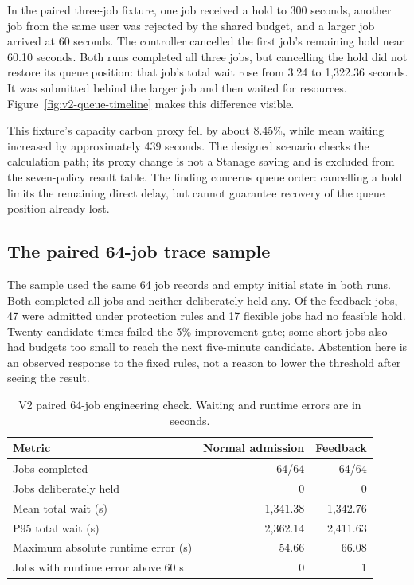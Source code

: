 In the paired three-job fixture, one job received a hold to 300 seconds, another job from the same user was rejected by the shared budget, and a larger job arrived at 60 seconds. The controller cancelled the first job's remaining hold near 60.10 seconds. Both runs completed all three jobs, but cancelling the hold did not restore its queue position: that job's total wait rose from 3.24 to 1,322.36 seconds. It was submitted behind the larger job and then waited for resources. Figure~\ref{fig:v2-queue-timeline} makes this difference visible.

\FloatBarrier

This fixture's capacity carbon proxy fell by about 8.45\%, while mean waiting increased by approximately 439 seconds. The designed scenario checks the calculation path; its proxy change is not a Stanage saving and is excluded from the seven-policy result table. The finding concerns queue order: cancelling a hold limits the remaining direct delay, but cannot guarantee recovery of the queue position already lost.

\subsection{The paired 64-job trace sample}
The sample used the same 64 job records and empty initial state in both runs. Both completed all jobs and neither deliberately held any. Of the feedback jobs, 47 were admitted under protection rules and 17 flexible jobs had no feasible hold. Twenty candidate times failed the 5\% improvement gate; some short jobs also had budgets too small to reach the next five-minute candidate. Abstention here is an observed response to the fixed rules, not a reason to lower the threshold after seeing the result.

\begin{table}[htbp]\centering\small
\caption{V2 paired 64-job engineering check. Waiting and runtime errors are in seconds.}\label{tab:v2-results}
\begin{tabular}{@{}lrr@{}}\toprule
Metric & Normal admission & Feedback\\\midrule
Jobs completed & 64/64 & 64/64\\
Jobs deliberately held & 0 & 0\\
Mean total wait (s) & 1,341.38 & 1,342.76\\
P95 total wait (s) & 2,362.14 & 2,411.63\\
Maximum absolute runtime error (s) & 54.66 & 66.08\\
Jobs with runtime error above 60 s & 0 & 1\\\bottomrule
\end{tabular}
\end{table}

